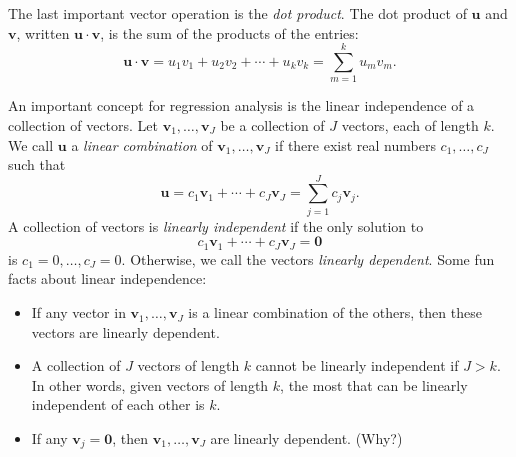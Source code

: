 \documentclass[
  12pt,
  oneside,openany]{book}
\begin{document}
The last important vector operation is the \emph{dot product}. The dot product of \(\mathbf{u}\) and \(\mathbf{v}\), written \(\mathbf{u} \cdot \mathbf{v}\), is the sum of the products of the entries:
\[
\mathbf{u} \cdot \mathbf{v}
=
u_1 v_1 + u_2 v_2 + \cdots + u_k v_k
=
\sum_{m=1}^k u_m v_m.
\]

An important concept for regression analysis is the linear independence of a collection of vectors. Let \(\mathbf{v}_1, \ldots, \mathbf{v}_J\) be a collection of \(J\) vectors, each of length \(k\). We call \(\mathbf{u}\) a \emph{linear combination} of \(\mathbf{v}_1, \ldots, \mathbf{v}_J\) if there exist real numbers \(c_1, \ldots, c_J\) such that
\[
\mathbf{u} = c_1 \mathbf{v}_1 + \cdots + c_J \mathbf{v}_J = \sum_{j=1}^J c_j \mathbf{v}_j.
\]
A collection of vectors is \emph{linearly independent} if the only solution to
\[
c_1 \mathbf{v}_1 + \cdots + c_J \mathbf{v}_J = \mathbf{0}
\]
is \(c_1 = 0, \ldots, c_J = 0\). Otherwise, we call the vectors \emph{linearly dependent}. Some fun facts about linear independence:

\begin{itemize}
\item
  If any vector in \(\mathbf{v}_1, \ldots, \mathbf{v}_J\) is a linear combination of the others, then these vectors are linearly dependent.
\item
  A collection of \(J\) vectors of length \(k\) cannot be linearly independent if \(J > k\). In other words, given vectors of length \(k\), the most that can be linearly independent of each other is \(k\).
\item
  If any \(\mathbf{v}_j = \mathbf{0}\), then \(\mathbf{v}_1, \ldots, \mathbf{v}_J\) are linearly dependent. (Why?)
\end{itemize}
\end{document}
